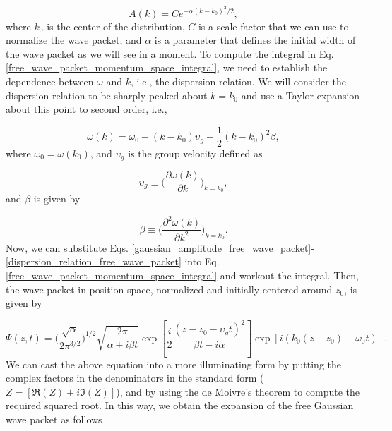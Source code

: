 \documentclass{article}
\begin{document}
\begin{equation}\label{gaussian_amplitude_free_wave_packet}
    A(k) = C e^{-\alpha(k-k_{0})^{2}/2} ,
\end{equation}
%
where $k_{0}$ is the center of the distribution, $C$ is a scale factor that we can use to normalize the wave packet, and $\alpha$ is a parameter that defines the initial width of the wave packet as we will see in a moment. To compute the integral in Eq. \ref{free_wave_packet_momentum_space_integral}, we need to establish the dependence between $\omega$ and $k$, i.e., the dispersion relation. We will consider the dispersion relation to be sharply peaked about $k=k_{0}$ and use a Taylor expansion about this point to second order, i.e.,

\begin{equation}\label{dispersion_relation_free_wave_packet}
    \omega(k) = \omega_{0} + (k-k_{0})\upsilon_{g} + \frac{1}{2}(k-k_{0})^{2} \beta ,
\end{equation}
%
where $\omega_{0}=\omega(k_{0})$, and $\upsilon_{g}$ is the group velocity defined as

\begin{equation}
    \upsilon_{g} \equiv \bigg(\frac{\partial \omega(k)}{\partial k}\bigg)_{k=k_{0}},
\end{equation}
%
and $\beta$ is given by

\begin{equation}
    \beta \equiv \bigg(\frac{\partial^2 \omega(k)}{\partial k^2}\bigg)_{k=k_{0}}.
\end{equation}
%
Now, we can substitute Eqs. \ref{gaussian_amplitude_free_wave_packet}-\ref{dispersion_relation_free_wave_packet} into Eq. \ref{free_wave_packet_momentum_space_integral} and workout the integral. Then, the wave packet in position space, normalized and initially centered around $z_{0}$, is given by

\begin{equation}
    \Psi (z, t) = \bigg(\frac{\sqrt{\alpha}}{2 \pi ^{3/2}} \bigg)^{1/2} \sqrt{\frac{2 \pi}{\alpha + i \beta t}} \exp \left[{\frac{i}{2}\frac{(z - z_{0} - \upsilon_{g} t)^{2}}{\beta t - i \alpha}} \right]  \exp[{i (k_{0}(z-z_{0})-\omega_{0} t)}].
\end{equation}
%
We can cast the above equation into a more illuminating form by putting the complex factors in the denominators in the standard form ($Z = [\Re(Z)+i\Im(Z)]$), and by using the de Moivre's theorem to compute the required squared root. In this way, we obtain the expansion of the free Gaussian wave packet as follows
\end{document}
